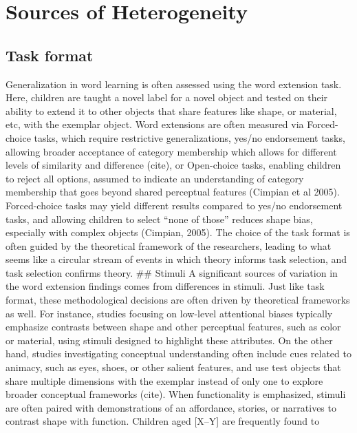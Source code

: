 \documentclass[10pt, letterpaper]{article}
\begin{document}
\hypertarget{sources-of-heterogeneity}{%
\section{Sources of Heterogeneity}\label{sources-of-heterogeneity}}

\hypertarget{task-format}{%
\subsection{Task format}\label{task-format}}

Generalization in word learning is often assessed using the word
extension task. Here, children are taught a novel label for a novel
object and tested on their ability to extend it to other objects that
share features like shape, or material, etc, with the exemplar object.
Word extensions are often measured via Forced-choice tasks, which
require restrictive generalizations, yes/no endorsement tasks, allowing
broader acceptance of category membership which allows for different
levels of similarity and difference (cite), or Open-choice tasks,
enabling children to reject all options, assumed to indicate an
understanding of category membership that goes beyond shared perceptual
features (Cimpian et al 2005). Forced-choice tasks may yield different
results compared to yes/no endorsement tasks, and allowing children to
select ``none of those'' reduces shape bias, especially with complex
objects (Cimpian, 2005). The choice of the task format is often guided
by the theoretical framework of the researchers, leading to what seems
like a circular stream of events in which theory informs task selection,
and task selection confirms theory. \#\# Stimuli A significant sources
of variation in the word extension findings comes from differences in
stimuli. Just like task format, these methodological decisions are often
driven by theoretical frameworks as well. For instance, studies focusing
on low-level attentional biases typically emphasize contrasts between
shape and other perceptual features, such as color or material, using
stimuli designed to highlight these attributes. On the other hand,
studies investigating conceptual understanding often include cues
related to animacy, such as eyes, shoes, or other salient features, and
use test objects that share multiple dimensions with the exemplar
instead of only one to explore broader conceptual frameworks (cite).
When functionality is emphasized, stimuli are often paired with
demonstrations of an affordance, stories, or narratives to contrast
shape with function. Children aged {[}X--Y{]} are frequently found to
\end{document}
